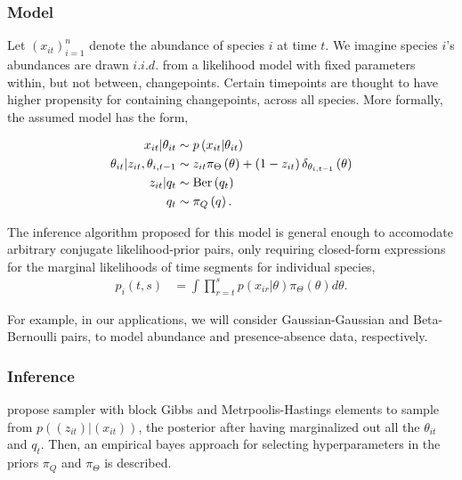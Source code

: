 \documentclass[14pt]{extreport}
\begin{document}
\subsubsection{Model}
\label{subsec:basic_model}

Let $\left(x_{it}\right)_{i = 1}^{n}$ denote the abundance of species $i$ at
time $t$. We imagine species $i$'s abundances are drawn $i.i.d.$ from a
likelihood model with fixed parameters within, but not between, changepoints.
Certain timepoints are thought to have higher propensity for containing
changepoints, across all species. More formally, the assumed model has the form,

\begin{align*}
  x_{it} \vert \theta_{it} &\sim p\left(x_{it} \vert \theta_{it}\right) \\
  \theta_{it} \vert z_{it}, \theta_{i,t - 1} &\sim z_{it}\pi_{\Theta}\left(\theta\right) + \left(1 - z_{it}\right) \delta_{\theta_{i, t - 1}}\left(\theta\right) \\
  z_{it} \vert q_{t} &\sim \textnormal{Ber}\left(q_{t}\right) \\
  q_t &\sim \pi_{Q}\left(q\right).
\end{align*}

The inference algorithm proposed for this model is general enough to accomodate
arbitrary conjugate likelihood-prior pairs, only requiring closed-form
expressions for the marginal likelihoods of time segments for individual
species,
\begin{align*}
  p_i\left(t, s\right) &= \int \prod_{r = t}^{s} p\left(x_{ir} \vert \theta\right) \pi_{\Theta}\left(\theta\right) d\theta.
\end{align*}

For example, in our applications, we will consider Gaussian-Gaussian and
Beta-Bernoulli pairs, to model abundance and presence-absence data,
respectively.

\subsubsection{Inference}
\label{subsubsec:basic_inference}

\cite{fan2015empirical} propose sampler with block Gibbs and Metrpoolis-Hastings
elements to sample from $p\left(\left(z_{it}\right) \vert
\left(x_{it}\right)\right)$, the posterior after having marginalized out all the
$\theta_{it}$ and $q_t$. Then, an empirical bayes approach for selecting
hyperparameters in the priors $\pi_{Q}$ and $\pi_{\Theta}$ is described.
\end{document}
